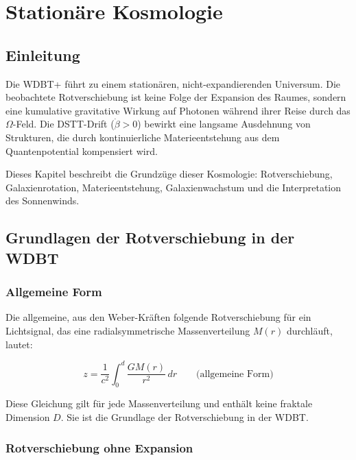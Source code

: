 
\chapter{Stationäre Kosmologie}
\label{ch:kosmologie}

\section{Einleitung}
\label{sec:kosmo_einleitung}

Die WDBT+ führt zu einem stationären, nicht-expandierenden Universum. Die beobachtete Rotverschiebung ist keine Folge der Expansion des Raumes, sondern eine kumulative gravitative Wirkung auf Photonen während ihrer Reise durch das \( \Omega \)-Feld. Die DSTT-Drift (\( \dot{\beta} > 0 \)) bewirkt eine langsame Ausdehnung von Strukturen, die durch kontinuierliche Materieentstehung aus dem Quantenpotential kompensiert wird.

Dieses Kapitel beschreibt die Grundzüge dieser Kosmologie: Rotverschiebung, Galaxienrotation, Materieentstehung, Galaxienwachstum und die Interpretation des Sonnenwinds.

\section{Grundlagen der Rotverschiebung in der WDBT}
\label{sec:kosmo_rotverschiebung}

\subsection{Allgemeine Form}
\label{sub:kosmo_rot_allgemein}

Die allgemeine, aus den Weber-Kräften folgende Rotverschiebung für ein Lichtsignal, das eine radialsymmetrische Massenverteilung \( M(r) \) durchläuft, lautet:

\[
z = \frac{1}{c^2} \int_0^d \frac{G M(r)}{r^2} \, dr \qquad \text{(allgemeine Form)}
\]

Diese Gleichung gilt für jede Massenverteilung und enthält keine fraktale Dimension \( D \). Sie ist die Grundlage der Rotverschiebung in der WDBT.

\subsection{Rotverschiebung ohne Expansion}
\label{sub:kosmo_rot_ohne_expansion}

